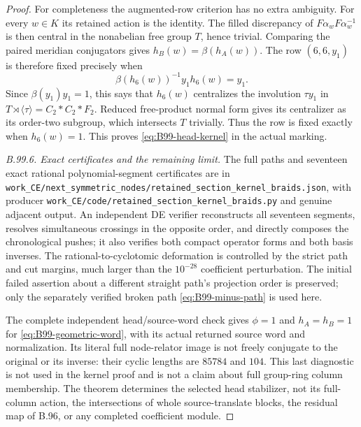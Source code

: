 \begin{proof}
For completeness the augmented-row criterion has no extra ambiguity.
For every $w\in K$ its retained action is the identity.
The filled discrepancy of $F\alpha_wF\alpha_w^{-1}$ is then central
in the nonabelian free group $T$, hence trivial.
Comparing the paired meridian conjugators gives
$h_B(w)=\beta(h_A(w))$.
The row $(6,6,y_1)$ is therefore fixed precisely when
\[
 \beta(h_6(w))^{-1}y_1h_6(w)=y_1.
\]
Since $\beta(y_1)y_1=1$, this says that $h_6(w)$ centralizes the
involution $\tau y_1$ in
$T\rtimes\langle\tau\rangle=C_2*C_2*F_2$.
Reduced free-product normal form gives its centralizer as its
order-two subgroup, which intersects $T$ trivially.
Thus the row is fixed exactly when $h_6(w)=1$.
This proves \eqref{eq:B99-head-kernel} in the actual marking.

\emph{B.99.6. Exact certificates and the remaining limit.}
The full paths and seventeen exact rational polynomial-segment
certificates are in
\texttt{work\_CE/next\_symmetric\_nodes/retained\_section\_kernel\_braids.json},
with producer
\texttt{work\_CE/code/retained\_section\_kernel\_braids.py}
and genuine adjacent output.
An independent DE verifier reconstructs all seventeen segments,
resolves simultaneous crossings in the opposite order, and directly
composes the chronological pushes; it also verifies both compact
operator forms and both basis inverses.
The rational-to-cyclotomic deformation is controlled by the strict
path and cut margins, much larger than the $10^{-28}$ coefficient
perturbation.
The initial failed assertion about a different straight path's
projection order is preserved; only the separately verified broken
path \eqref{eq:B99-minus-path} is used here.

The complete independent head/source-word check gives $\phi=1$ and
$h_A=h_B=1$ for \eqref{eq:B99-geometric-word}, with its actual
returned source word and normalization.
Its literal full node-relator image is not freely conjugate to the
original or its inverse: their cyclic lengths are $85784$ and $104$.
This last diagnostic is not used in the kernel proof and is not a
claim about full group-ring column membership.
The theorem determines the selected head stabilizer, not its
full-column action, the intersections of whole source-translate
blocks, the residual map of B.96, or any completed coefficient module.
\end{proof}
